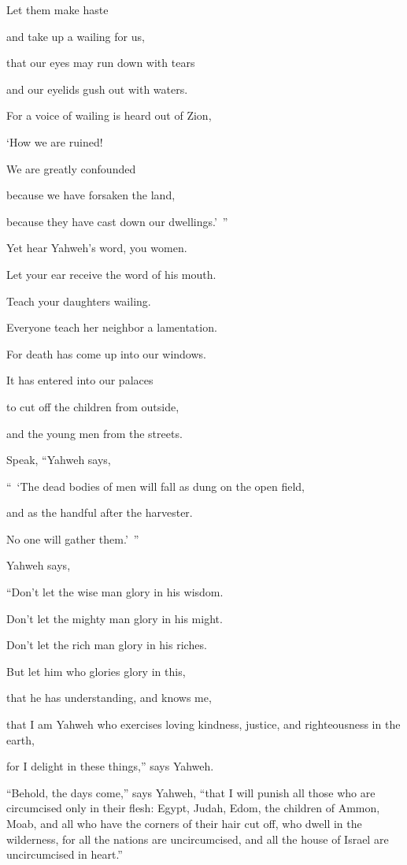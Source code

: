 {\par }{\Q {}Let them make haste
\par }{\QB and take up a wailing for us,
\par }{\Q that our eyes may run down with tears
\par }{\QB and our eyelids gush out with waters.
\par }{\Q {}For a voice of wailing is heard out of Zion,
\par }{\QB ‘How we are ruined!
\par }{\Q We are greatly confounded
\par }{\QB because we have forsaken the land,
\par }{\QB because they have cast down our dwellings.’ ”
\par }{\BB \par }{\Q {}Yet hear Yahweh’s word, you women.
\par }{\QB Let your ear receive the word of his mouth.
\par }{\Q Teach your daughters wailing.
\par }{\QB Everyone teach her neighbor a lamentation.
\par }{\Q {}For death has come up into our windows.
\par }{\QB It has entered into our palaces
\par }{\Q to cut off the children from outside,
\par }{\QB and the young men from the streets.
\par }{\PP {}Speak, “Yahweh says,
\par }{\Q “ ‘The dead bodies of men will fall as dung on the open field,
\par }{\QB and as the handful after the harvester.
\par }{\QB No one will gather them.’ ”
\par }{\PP {}Yahweh says,
\par }{\Q “Don’t let the wise man glory in his wisdom.
\par }{\QB Don’t let the mighty man glory in his might.
\par }{\QB Don’t let the rich man glory in his riches.
\par }{\Q {}But let him who glories glory in this,
\par }{\QB that he has understanding, and knows me,
\par }{\Q that I am Yahweh who exercises loving kindness, justice, and righteousness in the earth,
\par }{\QB for I delight in these things,” says Yahweh.
\par }{\PP {}“Behold, the days come,” says Yahweh, “that I will punish all those who are circumcised only in their flesh:
Egypt, Judah, Edom, the children of Ammon, Moab, and all who have the corners of their hair cut off, who dwell in the wilderness, for all the nations are uncircumcised, and all the house of Israel are uncircumcised in heart.”

}
